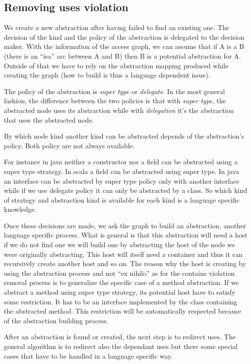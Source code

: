 \documentclass[]{article}
\begin{document}
\subsection{Removing uses violation}
We create a new abstraction after having failed to find an existing one. The decision of the kind and the policy of the abstraction is delegated to the decision maker. With the information of the access graph, we can assume that if A is a B (there is an ``isa'' arc between A and B) then B is a potential abstraction for A. Outside of that we have to rely on the abstraction mapping produced while creating the graph (how to build is thus a language dependent issue).

The policy of the abstraction is \emph{super type} or \emph{delegate}. In the most general fashion, the difference between the two policies is that with \emph{super type}, the abstracted node uses its abstraction while with \emph{delegation} it's the abstraction that uses the abstracted node.

By which node kind another kind can be abstracted depends of the abstraction's policy. Both policy are not always available.

For instance in java neither a constructor nor a field can be abstracted using a super type strategy. In scala a field can be abstracted using super type.
In java an interface can be abstracted by super type policy only with another interface while if we use delegate policy it can only be abstracted by a class.
So which kind of strategy and abstraction kind is available for each kind is a language specific knowledge. 

 
Once these decisions are made, we ask the graph to build an abstraction, another language specific process. What is general is that this abstraction will need a host if we do not find one we will build one by abstracting the host of the node we were originally abstracting. This host will itself need a container and thus it can recursively create another host and so on.
The reason why the host is creating by using the abstraction process and not ``ex nihilo'' as for the contains violation removal process is to generalize the specific case of a method abstraction.
If we abstract a method using super type strategy, its potential host have to satisfy some restriction. It has to be an interface implemented by the class containing the abstracted method. This restriction will be automatically respected because of the abstraction building process.


After an abstraction is found or created, the next step is to redirect uses. The general algorithm is to redirect also the dependant uses but there some special cases that have to be handled in a language specific way.
\end{document}
